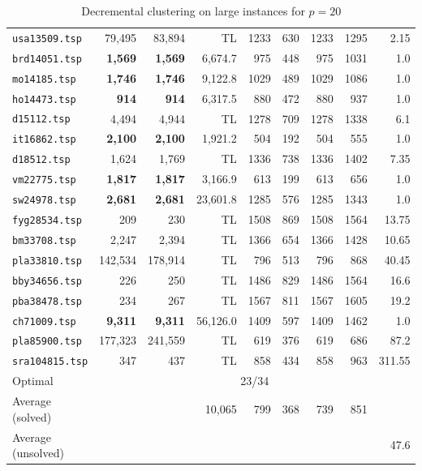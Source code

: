 \documentclass[ijoo,nonblindrev]{informs-ijoo}
\begin{document}
\begin{table}[!hbtp]
{\begin{tabular}{|l|rrrrrrrr|}
			\texttt{usa13509.tsp} & 79,495 & 83,894 & TL & 1233 & 630 & 1233 & 1295 & 2.15\\
			\texttt{brd14051.tsp} & \textbf{1,569} & \textbf{1,569} & 6,674.7 & 975 & 448 & 975 & 1031 & 1.0\\
			\texttt{mo14185.tsp} & \textbf{1,746} & \textbf{1,746} & 9,122.8 & 1029 & 489 & 1029 & 1086 & 1.0\\
			\texttt{ho14473.tsp} & \textbf{914} & \textbf{914} & 6,317.5 & 880 & 472 & 880 & 937 & 1.0\\
			\texttt{d15112.tsp} & 4,494 & 4,944 & TL & 1278 & 709 & 1278 & 1338 & 6.1\\
			\texttt{it16862.tsp} & \textbf{2,100} & \textbf{2,100} & 1,921.2 & 504 & 192 & 504 & 555 & 1.0\\
			\texttt{d18512.tsp} & 1,624 & 1,769 & TL & 1336 & 738 & 1336 & 1402 & 7.35\\
			\texttt{vm22775.tsp} & \textbf{1,817} & \textbf{1,817} & 3,166.9 & 613 & 199 & 613 & 656 & 1.0\\
			\texttt{sw24978.tsp} & \textbf{2,681} & \textbf{2,681} & 23,601.8 & 1285 & 576 & 1285 & 1343 & 1.0\\
			\texttt{fyg28534.tsp} & 209 & 230 & TL & 1508 & 869 & 1508 & 1564 & 13.75\\
			\texttt{bm33708.tsp} & 2,247 & 2,394 & TL & 1366 & 654 & 1366 & 1428 & 10.65\\
			\texttt{pla33810.tsp} & 142,534 & 178,914 & TL & 796 & 513 & 796 & 868 & 40.45\\
			\texttt{bby34656.tsp} & 226 & 250 & TL & 1486 & 829 & 1486 & 1564 & 16.6\\
			\texttt{pba38478.tsp} & 234 & 267 & TL & 1567 & 811 & 1567 & 1605 & 19.2\\
			\texttt{ch71009.tsp} & \textbf{9,311} & \textbf{9,311} & 56,126.0 & 1409 & 597 & 1409 & 1462 & 1.0\\
			\texttt{pla85900.tsp} & 177,323 & 241,559 & TL & 619 & 376 & 619 & 686 & 87.2\\
			\texttt{sra104815.tsp} & 347 & 437 & TL & 858 & 434 & 858 & 963 & 311.55\\
			\hline
			Optimal &  \multicolumn{8}{|c|}{23/34}\\
			Average (solved) & & & 10,065 & 799 & 368 & 739 & 851 & \\
			Average (unsolved) & & & & & & & & 47.6\\
			\hline
	\end{tabular}}
	\caption{Decremental clustering on large instances for $p = 20$\label{table:large:p20}}
\end{table}
\end{document}
